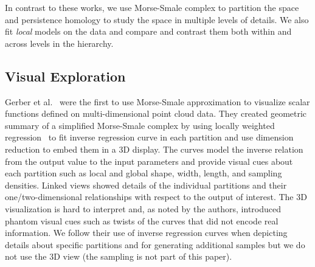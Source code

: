 In contrast to these works, we use Morse-Smale complex to partition the space and  persistence homology to study the space in multiple levels of details. We also fit \textit{local} models on the data and compare and contrast them both within and across levels in the hierarchy.


\subsection{Visual Exploration}
\label{sec:hd-exploration}

Gerber et al.~\cite{Gerber10} were the first to use Morse-Smale approximation to visualize scalar functions defined on multi-dimensional point cloud data. They created geometric summary of a simplified Morse-Smale complex by using locally weighted regression~\cite{Cleveland88} to fit inverse regression curve in each partition and use dimension reduction to embed them in a 3D display. The curves model the inverse relation from the output value to the input parameters and provide visual cues about each partition such as local and global shape, width, length, and sampling densities. Linked views showed details of the individual partitions and their one/two-dimensional relationships with respect to the output of interest. The 3D visualization is hard to interpret and, as noted by the authors, introduced phantom visual cues such as twists of the curves that did not encode real information. We follow their use of inverse regression curves when depicting details about specific partitions and for generating additional samples but we do not use the 3D view (the sampling is not part of this paper).

